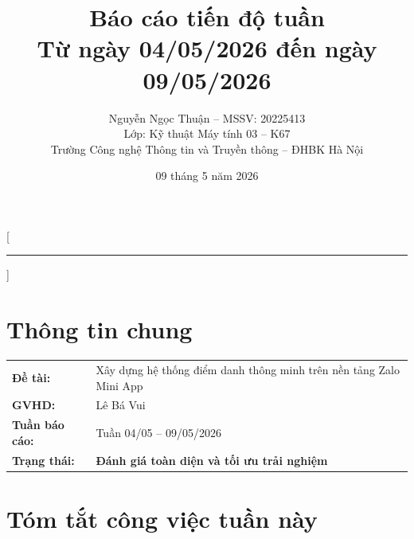 \documentclass{article}
\title{Báo cáo tiến độ tuần\\[0.3em] \large Từ ngày 04/05/2026 đến ngày 09/05/2026}
\author{Nguyễn Ngọc Thuận -- MSSV: 20225413\\[0.2em] \normalsize Lớp: Kỹ thuật Máy tính 03 -- K67\\[0.1em] \normalsize Trường Công nghệ Thông tin và Truyền thông -- ĐHBK Hà Nội}
\date{09 tháng 5 năm 2026}
\begin{document}
\maketitle



\pagestyle{fancy}
\fancyhf{}
\fancyfoot[C]{\small\thepage}
\renewcommand{\headrulewidth}{0.4pt}

[\vspace{-0.3em}\textcolor{hustred}{\rule{\textwidth}{0.8pt}}]

\section{Thông tin chung}

\begin{tabularx}{\textwidth}{@{}l X@{}}
\textbf{Đề tài:} & Xây dựng hệ thống điểm danh thông minh trên nền tảng Zalo Mini App \\
\textbf{GVHD:} & Lê Bá Vui \\
\textbf{Tuần báo cáo:} & Tuần 04/05 -- 09/05/2026 \\
\textbf{Trạng thái:} & \textcolor{statusgreen}{\textbf{Đánh giá toàn diện và tối ưu trải nghiệm}} \\
\end{tabularx}

\section{Tóm tắt công việc tuần này}
\end{document}
